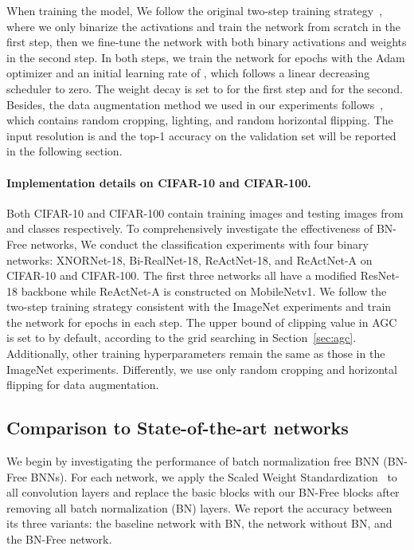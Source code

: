 \documentclass[final]{cvpr}
\begin{document}
When training the model, We follow the original two-step training strategy~\cite{liu2020reactnet}, where we only binarize the activations and train the network from scratch in the first step, then we fine-tune the network with both binary activations and weights in the second step. In both steps, we train the network for  epochs with the Adam optimizer and an initial learning rate of , which follows a linear decreasing scheduler to zero. The weight decay is set to  for the first step and  for the second.  Besides, the data augmentation method we used in our experiments follows~\cite{howard2017mobilenets}, which contains random cropping, lighting, and random horizontal flipping. The input resolution is  and the top-1 accuracy on the validation set will be reported in the following section.

\paragraph{Implementation details on CIFAR-10 and CIFAR-100.} Both CIFAR-10 and CIFAR-100 contain  training images and  testing images from  and  classes respectively. To comprehensively investigate the effectiveness of BN-Free networks, We conduct the classification experiments with four binary networks: XNORNet-18, Bi-RealNet-18, ReActNet-18, and ReActNet-A on CIFAR-10 and CIFAR-100. The first three networks all have a modified ResNet-18 backbone while ReActNet-A is constructed on MobileNetv1. We follow the two-step training strategy consistent with the ImageNet experiments and train the network for  epochs in each step. The upper bound of clipping value in AGC is set to  by default, according to the grid searching in  Section~\ref{sec:agc}. Additionally, other training hyperparameters remain the same as those in the ImageNet experiments. Differently, we use only random cropping and horizontal flipping for data augmentation.

\subsection{Comparison to State-of-the-art networks}
We begin by investigating the performance of batch normalization free BNN (BN-Free BNNs). For each network, we apply the Scaled Weight Standardization~\cite{brock2021agc} to all convolution layers and replace the basic blocks with our BN-Free blocks after removing all batch normalization (BN) layers. We report the accuracy between its three variants: the baseline network with BN, the network without BN, and the BN-Free network.
\end{document}
